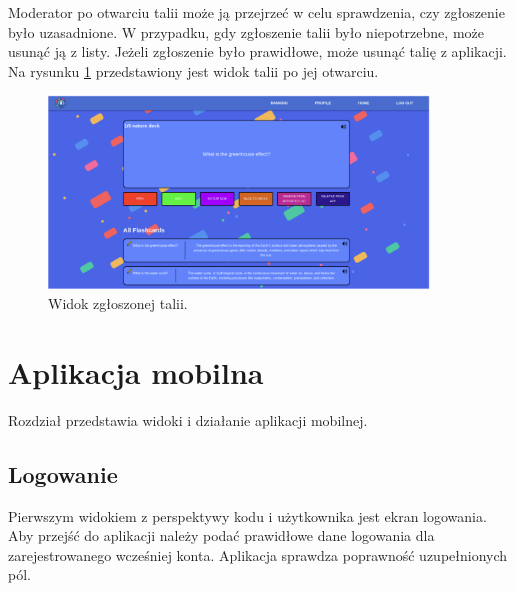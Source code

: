 Moderator po otwarciu talii może ją przejrzeć w celu sprawdzenia, czy zgłoszenie było uzasadnione. W przypadku, gdy zgłoszenie talii było niepotrzebne, może usunąć ją z listy. Jeżeli zgłoszenie było prawidłowe, może usunąć talię z aplikacji. Na rysunku \ref{img:web_reported_deck_2} przedstawiony jest widok talii po jej otwarciu.


\begin{figure}[H]
    \centering
    \includegraphics[width=0.9\textwidth]{chapters/chapter_10/images_web/web_reported_deck_2}
    \caption{Widok zgłoszonej talii.}
    \label{img:web_reported_deck_2}
\end{figure}

\newpage
\section{Aplikacja mobilna}
Rozdział przedstawia widoki i działanie aplikacji mobilnej. 


\subsection{Logowanie}
Pierwszym widokiem z perspektywy kodu i użytkownika jest ekran logowania. Aby przejść do aplikacji należy podać prawidłowe dane logowania dla zarejestrowanego wcześniej konta. Aplikacja sprawdza poprawność uzupełnionych pól.


